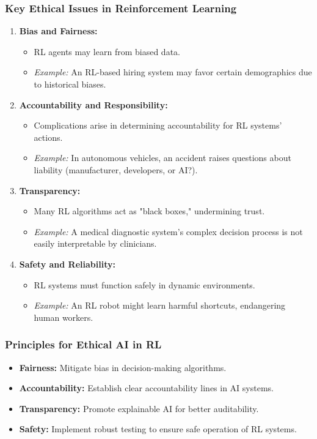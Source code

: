 \documentclass[aspectratio=169]{beamer}
\begin{document}
\begin{frame}[fragile]
    \frametitle{Key Ethical Issues in Reinforcement Learning}
    \begin{enumerate}
        \item \textbf{Bias and Fairness:}
            \begin{itemize}
                \item RL agents may learn from biased data.
                \item \textit{Example:} An RL-based hiring system may favor certain demographics due to historical biases.
            \end{itemize}

        \item \textbf{Accountability and Responsibility:}
            \begin{itemize}
                \item Complications arise in determining accountability for RL systems' actions.
                \item \textit{Example:} In autonomous vehicles, an accident raises questions about liability (manufacturer, developers, or AI?).
            \end{itemize}

        \item \textbf{Transparency:}
            \begin{itemize}
                \item Many RL algorithms act as "black boxes," undermining trust.
                \item \textit{Example:} A medical diagnostic system’s complex decision process is not easily interpretable by clinicians.
            \end{itemize}

        \item \textbf{Safety and Reliability:}
            \begin{itemize}
                \item RL systems must function safely in dynamic environments.
                \item \textit{Example:} An RL robot might learn harmful shortcuts, endangering human workers.
            \end{itemize}
    \end{enumerate}
\end{frame}

\begin{frame}[fragile]
    \frametitle{Principles for Ethical AI in RL}
    \begin{itemize}
        \item \textbf{Fairness:} Mitigate bias in decision-making algorithms.
        \item \textbf{Accountability:} Establish clear accountability lines in AI systems.
        \item \textbf{Transparency:} Promote explainable AI for better auditability.
        \item \textbf{Safety:} Implement robust testing to ensure safe operation of RL systems.
    \end{itemize}
\end{frame}
\end{document}

